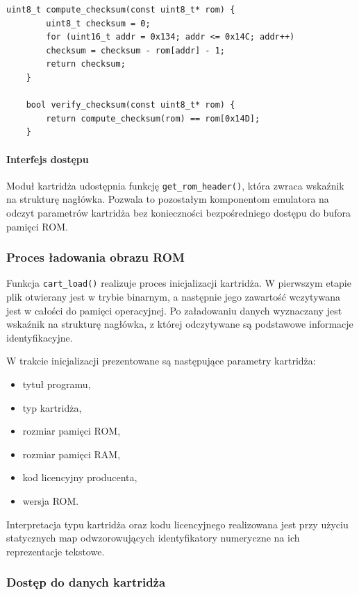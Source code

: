 \documentclass{article}
\begin{document}
\begin{lstlisting}[style=cpp, label={lst:checksum},
	caption={Weryfikacja sumy kontrolnej nagłówka}]
	uint8_t compute_checksum(const uint8_t* rom) {
		uint8_t checksum = 0;
		for (uint16_t addr = 0x134; addr <= 0x14C; addr++)
		checksum = checksum - rom[addr] - 1;
		return checksum;
	}
	
	bool verify_checksum(const uint8_t* rom) {
		return compute_checksum(rom) == rom[0x14D];
	}
\end{lstlisting}
\paragraph{Interfejs dostępu}

Moduł kartridża udostępnia funkcję \texttt{get\_rom\_header()}, która zwraca wskaźnik na strukturę nagłówka. Pozwala to pozostałym komponentom emulatora na odczyt parametrów kartridża bez konieczności bezpośredniego dostępu do bufora pamięci ROM.

\subsubsection{Proces ładowania obrazu ROM}

Funkcja \texttt{cart\_load()} realizuje proces inicjalizacji kartridża. W pierwszym etapie plik otwierany jest w trybie binarnym, a następnie jego zawartość wczytywana jest w całości do pamięci operacyjnej. Po załadowaniu danych wyznaczany jest wskaźnik na strukturę nagłówka, z której odczytywane są podstawowe informacje identyfikacyjne.

W trakcie inicjalizacji prezentowane są następujące parametry kartridża:
\begin{itemize}
	\item tytuł programu,
	\item typ kartridża,
	\item rozmiar pamięci ROM,
	\item rozmiar pamięci RAM,
	\item kod licencyjny producenta,
	\item wersja ROM.
\end{itemize}

Interpretacja typu kartridża oraz kodu licencyjnego realizowana jest przy użyciu statycznych map odwzorowujących identyfikatory numeryczne na ich reprezentacje tekstowe.

\subsubsection{Dostęp do danych kartridża}
\end{document}
